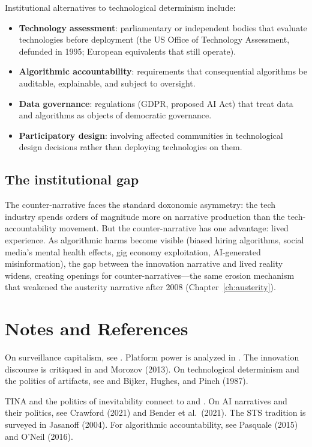 Institutional alternatives to technological determinism include:
\begin{itemize}[nosep]
  \item \textbf{Technology assessment}: parliamentary or independent bodies that evaluate technologies before deployment (the US Office of Technology Assessment, defunded in 1995; European equivalents that still operate).
  \item \textbf{Algorithmic accountability}: requirements that consequential algorithms be auditable, explainable, and subject to oversight.
  \item \textbf{Data governance}: regulations (GDPR, proposed AI Act) that treat data and algorithms as objects of democratic governance.
  \item \textbf{Participatory design}: involving affected communities in technological design decisions rather than deploying technologies on them.
\end{itemize}

\subsection{The institutional gap}

The counter-narrative faces the standard doxonomic asymmetry: the tech industry spends orders of magnitude more on narrative production than the tech-accountability movement.
But the counter-narrative has one advantage: lived experience.
As algorithmic harms become visible (biased hiring algorithms, social media's mental health effects, gig economy exploitation, AI-generated misinformation), the gap between the innovation narrative and lived reality widens, creating openings for counter-narratives---the same erosion mechanism that weakened the austerity narrative after 2008 (Chapter~\ref{ch:austerity}).

\section{Notes and References}
\label{sec:ch28-notes}

On surveillance capitalism, see \textcite{zuboff2019}.
Platform power is analyzed in \textcite{sunstein2017}.
The innovation discourse is critiqued in \textcite{mirowski2009} and Morozov (2013).
On technological determinism and the politics of artifacts, see \textcite{winner1986} and Bijker, Hughes, and Pinch (1987).

TINA and the politics of inevitability connect to \textcite{brown2015} and \textcite{streeck2016}.
On AI narratives and their politics, see Crawford (2021) and Bender et al.\ (2021).
The STS tradition is surveyed in Jasanoff (2004).
For algorithmic accountability, see Pasquale (2015) and O'Neil (2016).

